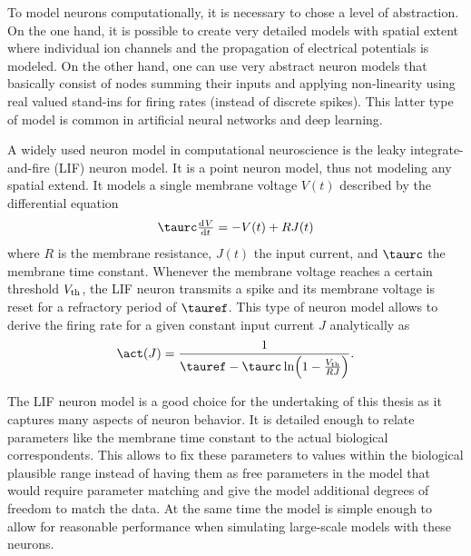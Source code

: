 To model neurons computationally, it is necessary to chose a level of abstraction.
On the one hand, it is possible to create very detailed models with spatial extent \parencite[e.g.,][]{markram2015,bahl2012} where individual ion channels and the propagation of electrical potentials is modeled.
On the other hand, one can use very abstract neuron models that basically consist of nodes summing their inputs and applying non-linearity using real valued stand-ins for firing rates (instead of discrete spikes).
This latter type of model is common in artificial neural networks and deep learning.

A widely used neuron model in computational neuroscience is the leaky integrate-and-fire (LIF) neuron model.
It is a point neuron model, thus not modeling any spatial extend.
It models a single membrane voltage $V(t)$ described by the differential equation
\begin{equation}
    \taurc \od{V}{t} = -V(t) + R J(t)
\end{equation}
where $R$ is the membrane resistance, $J(t)$ the input current, and $\taurc$ the membrane time constant.
Whenever the membrane voltage reaches a certain threshold $V_{{\mathrm{th}}}$, the LIF neuron transmits a spike and its membrane voltage is reset for a refractory period of $\tauref$.
This type of neuron model allows to derive the firing rate for a given constant input current $J$ analytically as
\begin{equation}
    \act(J) = \frac{1}{\tauref - \taurc \ln\!\del{1 - \frac{V_{\ped{th}}}{R J}}} \text{.}
\end{equation}

The LIF neuron model is a good choice for the undertaking of this thesis as it captures many aspects of neuron behavior.
It is detailed enough to relate parameters like the membrane time constant to the actual biological correspondents.
This allows to fix these parameters to values within the biological plausible range instead of having them as free parameters in the model that would require parameter matching and give the model additional degrees of freedom to match the data.
At the same time the model is simple enough to allow for reasonable performance when simulating large-scale models with these neurons.
